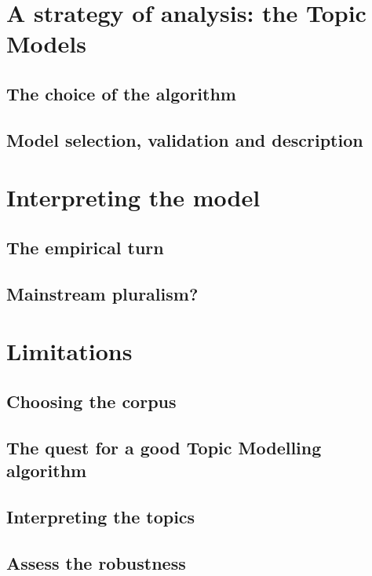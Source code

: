 \documentclass[a4paper, headings=standardclasses]{scrartcl}
\begin{document}
\section{A strategy of analysis: the Topic Models}

\subsection{The choice of the algorithm}

\subsection{Model selection, validation and description}

\section{Interpreting the model}

\subsection{The empirical turn}

\subsection{Mainstream pluralism?}

\section{Limitations}
\subsection{Choosing the corpus}

\subsection{The quest for a good Topic Modelling algorithm}

\subsection{Interpreting the topics}

\subsection{Assess the robustness}
\end{document}

